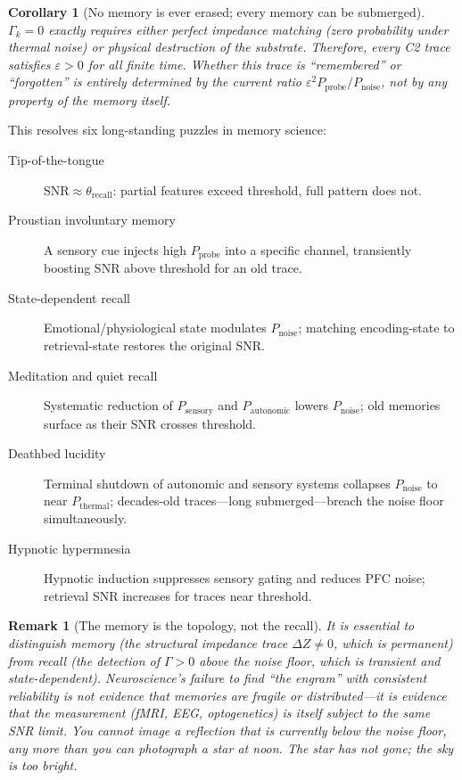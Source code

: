 \documentclass[aps,pre,twocolumn,superscriptaddress,floatfix]{revtex4-2}
\newtheorem{corollary}{Corollary}
\newtheorem{remark}{Remark}
\begin{document}
\begin{corollary}[No memory is ever erased; every memory
  can be submerged]
\label{cor:no-erasure}
$\Gamma_k = 0$ exactly requires either perfect impedance
matching (zero probability under thermal noise) or physical
destruction of the substrate.
Therefore, every C2 trace satisfies
$\varepsilon > 0$ for all finite time.
Whether this trace is ``remembered'' or ``forgotten''
is entirely determined by the current ratio
$\varepsilon^2 P_{\text{probe}} / P_{\text{noise}}$,
not by any property of the memory itself.
\end{corollary}

This resolves six long-standing puzzles in memory science:

\begin{description}
\item[Tip-of-the-tongue]
  $\mathrm{SNR} \approx \theta_{\text{recall}}$:
  partial features exceed threshold, full pattern
  does not.
\item[Proustian involuntary memory]
  A sensory cue injects high $P_{\text{probe}}$
  into a specific channel, transiently boosting
  SNR above threshold for an old trace.
\item[State-dependent recall]
  Emotional/physiological state modulates
  $P_{\text{noise}}$; matching encoding-state
  to retrieval-state restores the original SNR.
\item[Meditation and quiet recall]
  Systematic reduction of $P_{\text{sensory}}$
  and $P_{\text{autonomic}}$ lowers
  $P_{\text{noise}}$; old memories surface
  as their SNR crosses threshold.
\item[Deathbed lucidity]
  Terminal shutdown of autonomic and sensory
  systems collapses $P_{\text{noise}}$ to near
  $P_{\text{thermal}}$; decades-old traces---long
  submerged---breach the noise floor simultaneously.
\item[Hypnotic hypermnesia]
  Hypnotic induction suppresses sensory gating
  and reduces PFC noise; retrieval SNR increases
  for traces near threshold.
\end{description}

\begin{remark}[The memory is the topology, not
  the recall]
\label{rem:memory-topology}
It is essential to distinguish \emph{memory}
(the structural impedance trace $\Delta Z \neq 0$,
which is permanent) from \emph{recall}
(the detection of $\Gamma > 0$ above the noise
floor, which is transient and state-dependent).
Neuroscience's failure to find ``the engram''
with consistent reliability is not evidence that
memories are fragile or distributed---it is evidence
that the measurement (fMRI, EEG, optogenetics)
is itself subject to the same SNR limit.
You cannot image a reflection that is currently
below the noise floor, any more than you can
photograph a star at noon.
The star has not gone; the sky is too bright.
\end{remark}
\end{document}
